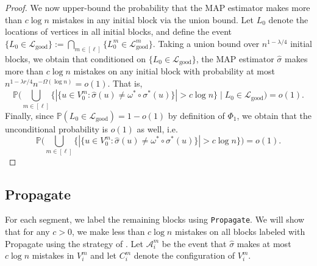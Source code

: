 \documentclass{article}
\renewcommand{\P}{\mathbb{P}}
\newcommand{\1}{\mathbbm{1}}
\newcommand{\calA}{\mathcal{A}}
\newcommand{\calL}{\mathcal{L}}
\theoremstyle{definition}
\theoremstyle{plain}
\begin{document}
\begin{proof}
    We now upper-bound the probability that the MAP estimator makes more than $c \log n$ mistakes in any initial block via the union bound. Let $L_0$ denote the locations of vertices in all initial blocks, and define the event $\{L_0 \in \calL_\text{good}\} := \bigcap_{m \in [\ell]} \{L_0^m \in \calL_\text{good}^m\}$. Taking a union bound over $n^{1 - \lambda/4}$ initial blocks, we obtain that conditioned on $\{L_0 \in \calL_\text{good}\}$, the MAP estimator $\hat{\sigma}$ makes more than $c \log n$ mistakes on any initial block with probability at most $n^{1-\lambda r/4} n^{-\Omega(\log n)} = o(1)$. That is,
    \begin{equation*}
        \P\bigg( \bigcup_{m \in [\ell]} \Big\{ |\{u \in V_0^m: \hat{\sigma}(u) \neq \omega^* \circ \sigma^*(u)\}| > c \log n \Big\} \mid L_0 \in \calL_\text{good}\bigg) = o(1).
    \end{equation*}
    Finally, since $\P(L_0 \in \calL_\text{good}) = 1 - o(1)$ by definition of $\Phi_1$, we obtain that the unconditional probability is $o(1)$ as well, i.e.
    \begin{equation*}
        \P\bigg( \bigcup_{m \in [\ell]} \Big\{ |\{u \in V_0^m: \hat{\sigma}(u) \neq \omega^* \circ \sigma^*(u)\}| > c \log n \Big\} \bigg) = o(1).
    \end{equation*}
\end{proof}



\subsection{Propagate}
For each segment, we label the remaining blocks using \texttt{Propagate}. We will show that for any $c > 0$, we make less than $c \log n$ mistakes on all blocks labeled with Propagate using the strategy of \cite{Gaudio+2025}. Let $\calA_i^m$ be the event that $\hat{\sigma}$ makes at most $c \log n$ mistakes in $V_i^m$ and let $C_i^m$ denote the configuration of $V_i^m$.
\end{document}
